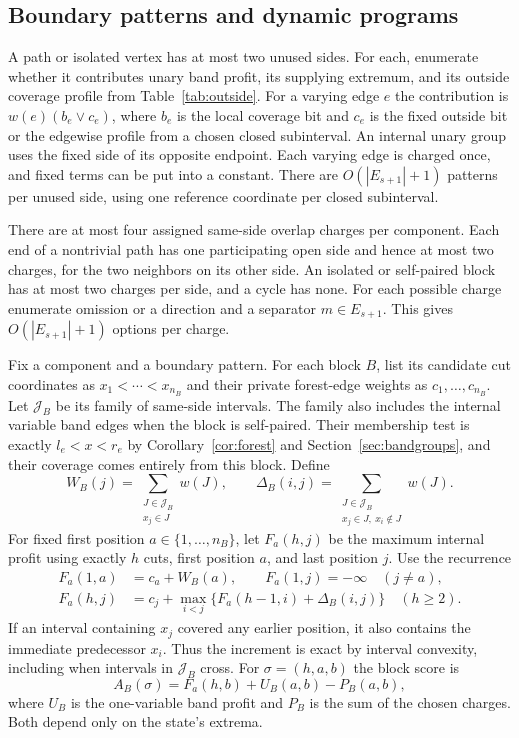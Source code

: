 \documentclass[10pt,letterpaper]{article}
\begin{document}
\subsection{Boundary patterns and dynamic programs}\label{sec:dp}
A path or isolated vertex has at most two unused sides. For each, enumerate whether it contributes unary band profit, its supplying extremum, and its outside coverage profile from Table~\ref{tab:outside}. For a varying edge \(e\) the contribution is \(w(e)(b_e\lor c_e)\), where \(b_e\) is the local coverage bit and \(c_e\) is the fixed outside bit or the edgewise profile from a chosen closed subinterval. An internal unary group uses the fixed side of its opposite endpoint. Each varying edge is charged once, and fixed terms can be put into a constant. There are \(O(|E_{s+1}|+1)\) patterns per unused side, using one reference coordinate per closed subinterval.

There are at most four assigned same-side overlap charges per component. Each end of a nontrivial path has one participating open side and hence at most two charges, for the two neighbors on its other side. An isolated or self-paired block has at most two charges per side, and a cycle has none. For each possible charge enumerate omission or a direction and a separator \(m\in E_{s+1}\). This gives \(O(|E_{s+1}|+1)\) options per charge.

Fix a component and a boundary pattern. For each block \(B\), list its candidate cut coordinates as \(x_1<\cdots<x_{n_B}\) and their private forest-edge weights as \(c_1,\ldots,c_{n_B}\). Let \(\mathcal J_B\) be its family of same-side intervals. The family also includes the internal variable band edges when the block is self-paired. Their membership test is exactly \(l_e<x<r_e\) by Corollary~\ref{cor:forest} and Section~\ref{sec:bandgroups}, and their coverage comes entirely from this block. Define
\[
 W_B(j)=\sum_{\substack{J\in\mathcal J_B\\x_j\in J}}w(J),
 \qquad
 \Delta_B(i,j)=\sum_{\substack{J\in\mathcal J_B\\x_j\in J,\ x_i\notin J}}w(J).
\]
For fixed first position \(a\in\{1,\ldots,n_B\}\), let \(F_a(h,j)\) be the maximum internal profit using exactly \(h\) cuts, first position \(a\), and last position \(j\). Use the recurrence
\[
\begin{aligned}
 F_a(1,a)&=c_a+W_B(a),\qquad F_a(1,j)=-\infty\quad(j\ne a),\\
 F_a(h,j)&=c_j+\max_{i<j}\{F_a(h-1,i)+\Delta_B(i,j)\}\quad(h\ge2).
\end{aligned}
\]
If an interval containing \(x_j\) covered any earlier position, it also contains the immediate predecessor \(x_i\). Thus the increment is exact by interval convexity, including when intervals in \(\mathcal J_B\) cross. For \(\sigma=(h,a,b)\) the block score is
\[
        A_B(\sigma)=F_a(h,b)+U_B(a,b)-P_B(a,b),
\]
where \(U_B\) is the one-variable band profit and \(P_B\) is the sum of the chosen charges. Both depend only on the state's extrema.
\end{document}
